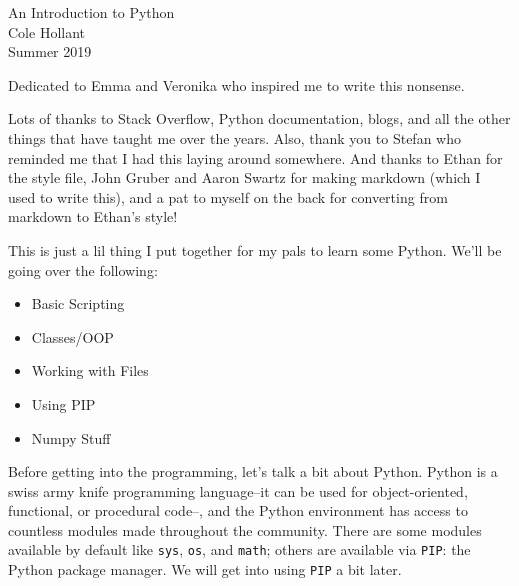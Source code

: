 \documentclass[12pt, twoside, reqno]{book}
\begin{document}
\begin{center}
  \vspace*{120px}
  \Huge{An Introduction to Python}\\
  \vspace{32px}
  \Large{Cole Hollant}  \\
  \vspace{200px}
  \large{Summer 2019}
\end{center}

\newpage

\tableofcontents

\dedic

Dedicated to Emma and Veronika who inspired me to write this nonsense.

\acknowl

Lots of thanks to Stack Overflow, Python documentation, blogs, and all the other things that have taught me over the years. Also, thank you to Stefan who reminded me that I had this laying around somewhere. And thanks to Ethan for the style file, John Gruber and Aaron Swartz for making markdown (which I used to write this), and a pat to myself on the back for converting from markdown to Ethan's style!

\startmain


\intro

This is just a lil thing I put together for my pals to learn some Python. We'll be going over the following:
\begin{itemize}[itemsep=2px, parsep=0pt]
\item Basic Scripting
\item Classes/OOP
\item Working with Files
\item Using PIP
\item Numpy Stuff
\end{itemize}

Before getting into the programming, let's talk a bit about Python. Python is a swiss army knife programming language--it can be used for object-oriented, functional, or procedural code--, and the Python environment has access to countless modules made throughout the community. There are some modules available by default like \texttt{sys}, \texttt{os}, and \texttt{math}; others are available via \texttt{PIP}: the Python package manager. We will get into using \texttt{PIP} a bit later.
\end{document}
